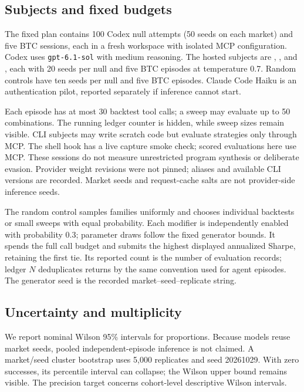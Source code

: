 \documentclass[11pt]{article}
\begin{document}
\subsection{Subjects and fixed budgets}
The fixed plan contains 100 Codex null attempts (50 seeds on each market) and
five BTC sessions, each in a fresh workspace with isolated MCP configuration.
Codex uses \texttt{gpt-6.1-sol} with medium reasoning. The hosted subjects are
,
, and
, each with 20 seeds per null and five
BTC episodes at temperature 0.7. Random controls have ten seeds per null and
five BTC episodes. Claude Code Haiku is an authentication pilot, reported
separately if inference cannot start.

Each episode has at most 30 backtest tool calls; a sweep may evaluate up to
50 combinations. The running ledger counter is hidden, while sweep sizes remain
visible. CLI subjects may write scratch code but evaluate strategies only through
MCP. The shell hook has a live capture smoke check; scored evaluations here use
MCP. These sessions do not measure unrestricted program synthesis or deliberate
evasion. Provider weight revisions were not pinned; aliases and available CLI
versions are recorded. Market seeds and request-cache salts are not
provider-side inference seeds.

The random control samples families uniformly and chooses individual backtests
or small sweeps with equal probability. Each modifier is independently enabled
with probability 0.3; parameter draws follow the fixed generator bounds. It
spends the full call budget and submits the highest displayed annualized Sharpe,
retaining the first tie. Its reported count is the number of evaluation records;
ledger $N$ deduplicates returns by the same convention used for agent episodes.
The generator seed is the recorded market--seed--replicate string.

\subsection{Uncertainty and multiplicity}
We report nominal Wilson 95\% intervals for proportions. Because models reuse
market seeds, pooled independent-episode inference is not claimed. A market/seed
cluster bootstrap uses 5,000 replicates and seed 20261029. With zero successes,
its percentile interval can collapse; the Wilson upper bound remains visible.
The precision target concerns cohort-level descriptive Wilson intervals.
\end{document}
